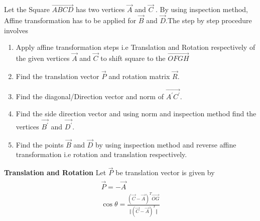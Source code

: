\documentclass[journal,12pt,twocolumn]{IEEEtran}
\begin{document}
Let the Square $\vec{ABCD}$ has two vertices $\vec{A}$ and $\vec{C}$ . By using inspection method, Affine transformation has to be applied for $\vec{B}$ and $\vec{D}$.The step by step procedure involves
\begin{enumerate}
	\item Apply affine transformation steps i.e Translation and Rotation respectively of the given vertices $\vec{A}$ and $\vec{C}$ to shift square to the $\vec{OFGH}$ 
	\item Find the translation vector $\vec{P}$ and rotation matrix $\vec{R}$.
    \item Find the diagonal/Direction vector and norm of $\vec{A^{'}C^{'}}$.
    \item Find the side direction vector and using norm and inspection method find the vertices $\vec{B^{'}}$ and $\vec{D^{'}}$.
    \item Find the points $\vec{B}$ and $\vec{D}$ by using inspection method and reverse affine transformation i.e rotation and translation respectively.
\end{enumerate}
\textbf{Translation and Rotation}
Let $\vec{P}$ be translation vector is given by 
\begin{align}
\begin{split}
\vec{P} = -\vec{A}\\
\cos \theta = \frac{(\vec{C}-\vec{A})^T \vec{OG}}{\Vert(\vec{C}-\vec{A})^T\Vert}
    \end{split}
\end{align}
\end{document}
